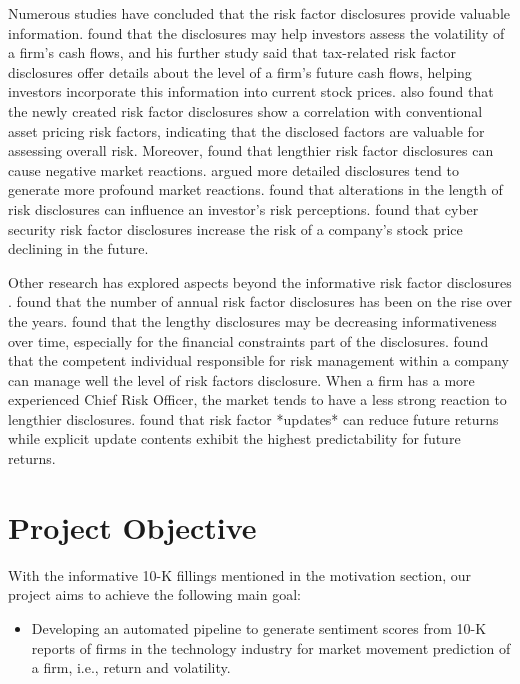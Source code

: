 \documentclass[logo,bsc,singlespacing,parskip]{infthesis}
\begin{document}
Numerous studies have concluded that the risk factor disclosures provide valuable information. \cite{campbelletal2014a} found that the disclosures may help investors assess the volatility of a firm’s cash flows, and his further study said that tax-related risk factor disclosures offer details about the level of a firm’s future cash flows, helping investors incorporate this information into current stock prices. \cite{israelsen2014} also found that the newly created risk factor disclosures show a correlation with conventional asset pricing risk factors, indicating that the disclosed factors are valuable for assessing overall risk. Moreover, \cite{campbelletal2014a} found that lengthier risk factor disclosures can cause negative market reactions. \cite{hopeetal2016} argued more detailed disclosures tend to generate more profound market reactions. \cite{kravetmuslu2013} found that alterations in the length of risk disclosures can influence an investor’s risk perceptions. \cite{songetal2020} found that cyber security risk factor disclosures increase the risk of a company’s stock price declining in the future. 

Other research has explored aspects beyond the informative risk factor disclosures \cite{dyeretal2016}. \cite{beattychengzhang2015} found that the number of annual risk factor disclosures has been on the rise over the years. \cite{beattychengzhang2015} found that the lengthy disclosures may be decreasing informativeness over time, especially for the financial constraints part of the disclosures. \cite{baileyfilzen2016} found that the competent individual responsible for risk management within a company can manage well the level of risk factors disclosure. When a firm has a more experienced Chief Risk Officer, the market tends to have a less strong reaction to lengthier disclosures. \cite{filzenmcbrayershannon2016} found that risk factor *updates* can reduce future returns while explicit update contents exhibit the highest predictability for future returns.

\section{Project Objective}
With the informative 10-K fillings mentioned in the motivation section, our project aims to achieve the following main goal:

\begin{itemize}
    \item Developing an automated pipeline to generate sentiment scores from 10-K reports of firms in the technology industry for market movement prediction of a firm, i.e., return and volatility.
\end{itemize}
\end{document}
